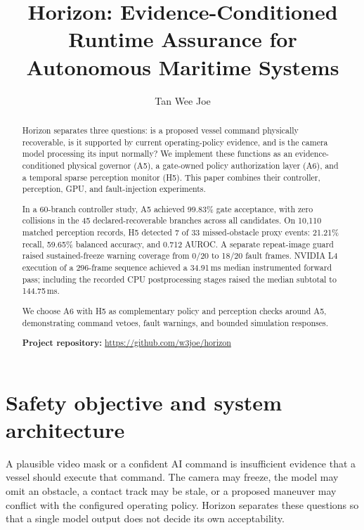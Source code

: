 \documentclass[sigconf,nonacm]{acmart}
\title{Horizon: Evidence-Conditioned Runtime Assurance for Autonomous Maritime Systems}
\author{Tan Wee Joe}
\affiliation{\institution{University College London}\city{London}\country{United Kingdom}}
\begin{document}
\begin{abstract}
Horizon separates three questions: is a proposed vessel command physically recoverable, is it supported by current operating-policy evidence, and is the camera model processing its input normally? We implement these functions as an evidence-conditioned physical governor (A5), a gate-owned policy authorization layer (A6), and a temporal sparse perception monitor (H5). This paper combines their controller, perception, GPU, and fault-injection experiments.

In a 60-branch controller study, A5 achieved 99.83\% gate acceptance, with zero collisions in the 45 declared-recoverable branches across all candidates. On 10,110 matched perception records, H5 detected 7 of 33 missed-obstacle proxy events: 21.21\% recall, 59.65\% balanced accuracy, and 0.712 AUROC. A separate repeat-image guard raised sustained-freeze warning coverage from 0/20 to 18/20 fault frames. NVIDIA L4 execution of a 296-frame sequence achieved a 34.91\,ms median instrumented forward pass; including the recorded CPU postprocessing stages raised the median subtotal to 144.75\,ms.

We choose A6 with H5 as complementary policy and perception checks around A5, demonstrating command vetoes, fault warnings, and bounded simulation responses.

\par\smallskip\noindent\textbf{Project repository:} \url{https://github.com/w3joe/horizon}
\end{abstract}
\maketitle
\section{Safety objective and system architecture}

A plausible video mask or a confident AI command is insufficient evidence that a vessel should execute that command. The camera may freeze, the model may omit an obstacle, a contact track may be stale, or a proposed maneuver may conflict with the configured operating policy. Horizon separates these questions so that a single model output does not decide its own acceptability.
\end{document}
